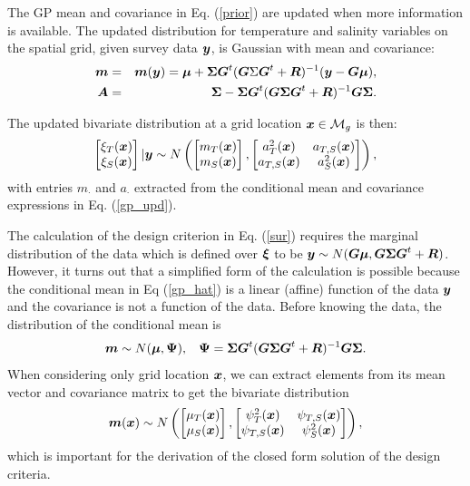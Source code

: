 \documentclass[aoas]{imsart}
\begin{document}
The GP mean and covariance in Eq. (\ref{prior}) are updated when more information is available. The
updated distribution for temperature and salinity variables on the
spatial grid, given survey data ${\boldsymbol y}$, is Gaussian with mean and
covariance: 
\begin{eqnarray}\label{gp_upd}
  \bm &=& \bm(\by) = \bmu+\bSigma \bG^t (\bG \Sigma \bG^t+\bR)^{-1}(\by-\bG \bmu),  \\
  \bA &=& \bSigma - \bSigma \bG^t (\bG \bSigma \bG^t+\bR)^{-1} \bG
          \bSigma.\nonumber
\end{eqnarray}

The updated bivariate distribution at a grid location ${\boldsymbol x} \in
\mathcal{M}_g$ is then: 
\begin{equation}\label{gp_hat}
\begin{bmatrix}
\xi_T(\bx) \\
\xi_S(\bx)
\end{bmatrix}
 |\by
 \sim N \left( 
\begin{bmatrix} m_{T}(\bx)\\
m_{S}(\bx)
\end{bmatrix},\begin{bmatrix}
a_{T}^2(\bx) & a_{T,S}(\bx)  \\
a_{T,S}(\bx)  & a_{S}^2(\bx)  
\end{bmatrix}
\right),
\end{equation}
with entries $m_{\cdot}$ and $a_{\cdot}$ extracted from the conditional mean and covariance
expressions in Eq. (\ref{gp_upd}).

The calculation of the design criterion in Eq. (\ref{sur}) requires
the marginal distribution of the data which is defined over ${\boldsymbol \xi}$ to
be ${\boldsymbol y} \sim N( {\boldsymbol G} {\boldsymbol \mu},{\boldsymbol G} {\boldsymbol \Sigma} {\boldsymbol G}^t+{\boldsymbol R})$.  However, it turns
out that a simplified form of the calculation is possible because the
conditional mean in Eq (\ref{gp_hat}) is a linear (affine) function of
the data ${\boldsymbol y}$ and the covariance is not a function of the data.
Before knowing the data, the distribution of the conditional mean is
\begin{equation}\label{distxi} \bm \sim N(\bmu , \bPsi), \hspace{3mm}
  \bPsi=\bSigma \bG^t (\bG \bSigma \bG^t+\bR)^{-1} \bG \bSigma.
\end{equation} 
When considering only grid location ${\boldsymbol x}$, we can
extract elements from its mean vector and covariance matrix to get the
bivariate distribution \begin{equation}\label{dist_mxi} 
  \bm(\bx) \sim N \left( \begin{bmatrix}
      \mu_{T}(\bx) \\
      \mu_{S}(\bx) \end{bmatrix}, \begin{bmatrix}
      \psi^2_{T}(\bx) & \psi_{T,S}(\bx)\\
      \psi_{T,S}(\bx) & \psi^2_{S}(\bx) \end{bmatrix} \right),
\end{equation}
which is important for the derivation of the closed form solution of the design criteria.
\end{document}
